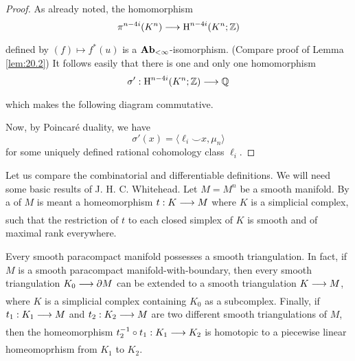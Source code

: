 \documentclass[../main]{subfiles}
\begin{document}
\begin{proof}
As already noted, the homomorphism \[\pi^{n-4i}(K^n) \varrightarrow{} \homology^{n-4i}(K^n;\mathbb{Z})\] defined by $(f) \mapsto f^\ast(u)$ is a $\mathbf{Ab}_{<\infty}$-isomorphism. (Compare proof of Lemma \ref{lem:20.2}) It follows easily that there is one and only one homomorphism \[\sigma':\homology^{n-4i}(K^n;\mathbb{Z}) \varrightarrow{} \mathbb{Q}\] which makes the following diagram commutative. 

\begin{center}
\end{center}

Now, by Poincaré duality, we have \[\sigma'(x) = \langle \ell_i \smile x, \mu_n \rangle\] for some uniquely defined rational cohomology class $\ell_i$.
\end{proof}

Let us compare the combinatorial and differentiable definitions. We will need some basic results of J. H. C. Whitehead. Let $M = M^n$ be a smooth manifold. By a  of $M$ is meant a homeomorphism $t:K \varrightarrow{} M$ where $K$ is a simplicial complex, such that the restriction of $t$ to each closed simplex of $K$ is smooth and of maximal rank everywhere.

\begin{theorem*}
Every smooth paracompact manifold possesses a smooth triangulation. In fact, if $M$ is a smooth paracompact manifold-with-boundary, then every smooth triangulation $K_0 \varrightarrow{} \partial M$ can be extended to a smooth triangulation $K \varrightarrow{} M$, where $K$ is a simplicial complex containing $K_0$ as a subcomplex. Finally, if $t_1:K_1 \varrightarrow{} M$ and $t_2:K_2 \varrightarrow{} M$ are two different smooth triangulations of $M$, then the homeomorphism $t_2^{-1} \circ t_1: K_1 \varrightarrow{} K_2$ is homotopic to a piecewise linear homeomoprhism from $K_1$ to $K_2$.
\end{theorem*}
\end{document}
